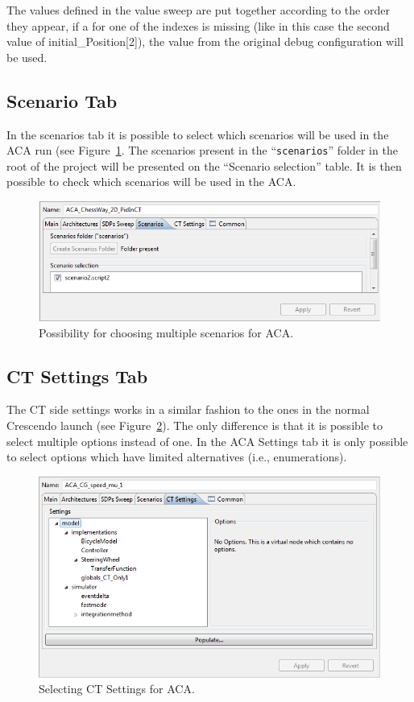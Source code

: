 \documentclass{crescendorepchap}
\begin{document}
The values defined in the value sweep are put together according to the
order they appear, if a for one of the indexes is missing (like in this
case the second value of initial\_Position{[}2{]}), the value from the
original debug configuration will be used.

\subsection{Scenario Tab}

In the scenarios tab it is possible to select which scenarios will be
used in the ACA run (see Figure~\ref{fig:ScenariosACATab}. 
The scenarios present in the ``\texttt{scenarios}'' folder
in the root of the project will be presented on the ``Scenario
selection'' table. It is then possible to check which scenarios will be
used in the ACA.

\begin{figure}[htbp]
\centering
\includegraphics[width=.6\textwidth]{images/ScenariosACATab.PNG}
\caption{Possibility for choosing multiple scenarios for ACA.\label{fig:ScenariosACATab}}
\end{figure}

\subsection{CT Settings Tab}

The CT side settings works in a similar fashion to the ones in
the normal
Crescendo launch (see Figure~\ref{fig:SettingsACATab}). 
The only difference is that it is possible to select
multiple options instead of one. In the ACA Settings tab it is only
possible to select options which have limited alternatives (i.e.,
enumerations).

\begin{figure}[htbp]
\centering
\includegraphics[width=.6\textwidth]{images/SettingsACATab.png}
\caption{Selecting CT Settings for ACA.\label{fig:SettingsACATab}}
\end{figure}
\end{document}
